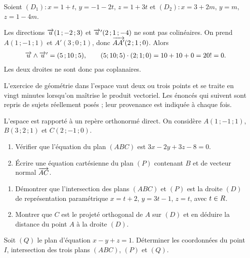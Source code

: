 \begin{exemple}
Soient $(D_{1}) : x = 1+t$, $y = -1-2t$, $z = 1+3t$ et
$(D_{2}) : x = 3+2m$, $y = m$, $z = 1-4m$.

Les directions $\overrightarrow{u}(1\,;-2\,;3)$ et $\overrightarrow{u}'(2\,;1\,;-4)$ ne sont pas
colinéaires. On prend $A(1\,;-1\,;1)$ et $A'(3\,;0\,;1)$, donc
$\overrightarrow{AA'}(2\,;1\,;0)$. Alors
\[
  \overrightarrow{u} \wedge \overrightarrow{u}' = (5\,;10\,;5),
  \qquad
  (5;10;5) \cdot (2;1;0) = 10+10+0 = 20 != 0 .
\]
Les deux droites ne sont donc pas coplanaires.
\end{exemple}

\begin{annales}
L'exercice de géométrie dans l'espace vaut deux ou trois points et se traite
en vingt minutes lorsqu'on maîtrise le produit vectoriel. Les énoncés qui
suivent sont repris de sujets réellement posés ; leur provenance est indiquée
à chaque fois.

L'espace est rapporté à un repère orthonormé direct. On considère
$A(1\,;-1\,;1)$, $B(3\,;2\,;1)$ et $C(2\,;-1\,;0)$.
\begin{enumerate}[label=\textbf{\arabic*)}, leftmargin=*, itemsep=0.15em]
  \item Vérifier que l'équation du plan $(ABC)$ est $3x-2y+3z-8 = 0$.
  \item Écrire une équation cartésienne du plan $(P)$ contenant $B$ et de
        vecteur normal $\overrightarrow{AC}$.
\end{enumerate}

\begin{enumerate}[label=\textbf{\alph*)}, leftmargin=*, itemsep=0.15em]
  \item Démontrer que l'intersection des plans $(ABC)$ et $(P)$ est la droite
        $(D)$ de représentation paramétrique
        $x = t+2$, $y = 3t-1$, $z = t$, avec $t \in R$.
  \item Montrer que $C$ est le projeté orthogonal de $A$ sur $(D)$ et en
        déduire la distance du point $A$ à la droite $(D)$.
\end{enumerate}

Soit $(Q)$ le plan d'équation $x-y+z = 1$. Déterminer les coordonnées du point
$I$, intersection des trois plans $(ABC)$, $(P)$ et $(Q)$.


\end{annales}
